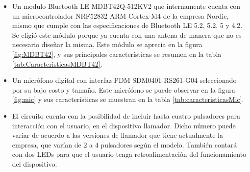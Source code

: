 \begin{itemize}

\item Un modulo Bluetooth LE MDBT42Q-512KV2 que internamente cuenta con un microcontrolador NRF52832 ARM Cortex-M4 de la empresa Nordic, mismo que cumple con las especificaciones de Bluetooth LE 5.2, 5.2, 5 y 4.2. Se eligió este módulo porque ya cuenta con una antena de manera que no es necesario diseñar la misma. Este módulo se aprecia en la figura \ref{fig:MDBT42}, y sus principales características se resumen en la tabla \ref{tab:CaracteristicasMDBT42}.

\item Un micrófono digital con interfaz PDM SDM0401-RS261-G04 seleccionado por su bajo costo y tamaño. Este micrófono se puede observar en la figura \ref{fig:mic} y sus características se muestran en la tabla \ref{tab:caracteristicasMic}.

\item El circuito cuenta con la posibilidad de incluir hasta cuatro pulsadores para interacción con el usuario, en el dispositivo llamador. Dicho número puede variar de acuerdo a las versiones de llamador que tiene actualmente la empresa, que varían de 2 a 4 pulsadores según el modelo. También contará con dos LEDs para que el usuario tenga retroalimentación del funcionamiento del dispositivo.

\end{itemize}

